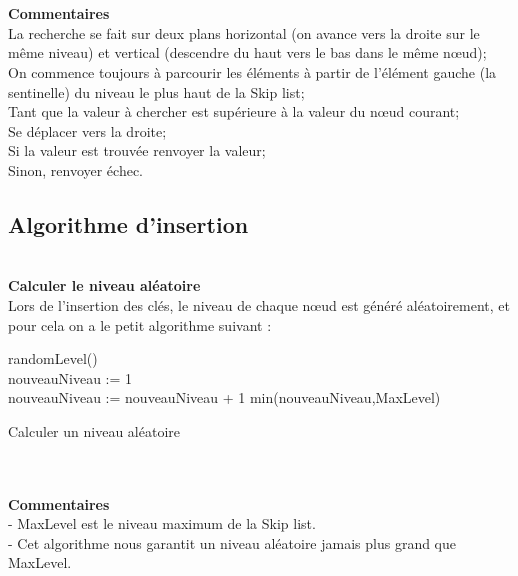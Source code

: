 \documentclass[hidelinks,a4paper,12pt]{article}
\begin{document}
~\\~\\
\textbf {Commentaires} \medskip  \\
La recherche se fait sur deux plans horizontal (on avance vers la droite sur le même niveau) et vertical (descendre du haut vers le bas dans le même nœud);\smallskip \\
On commence toujours à parcourir les éléments à partir de l’élément gauche (la sentinelle) du niveau le plus haut de la Skip list;\smallskip \\
Tant que la valeur à chercher est supérieure à la valeur du nœud courant;\smallskip \\
Se déplacer vers la droite;\smallskip \\
Si la valeur est trouvée renvoyer la valeur; \smallskip \\
Sinon, renvoyer échec.

\newpage

\subsection{Algorithme d'insertion}


~\\
\textbf {Calculer le niveau aléatoire} \\
 Lors de l’insertion des clés, le niveau de chaque nœud est généré aléatoirement, et pour cela on a le petit algorithme suivant :\\

\begin{algorithm}[H]
	\hyperlink{depart2}{\hypertarget{rlvl}{}}  
	\DontPrintSemicolon	
	randomLevel() \\
	\tcp*{random() renvoie une valeur aléatoire appartenant à l’intervalle [0...1) }
	nouveauNiveau := 1 \\
		{	nouveauNiveau := nouveauNiveau + 1
		}	 
	\Return  min(nouveauNiveau,MaxLevel)
	\caption{Calculer un niveau aléatoire}
\end{algorithm}

~\\~\\
\textbf {Commentaires} \medskip  \\
- MaxLevel est le niveau maximum de la Skip list. \\ 
- Cet algorithme nous garantit un niveau aléatoire jamais plus grand que MaxLevel. \\
\end{document}
